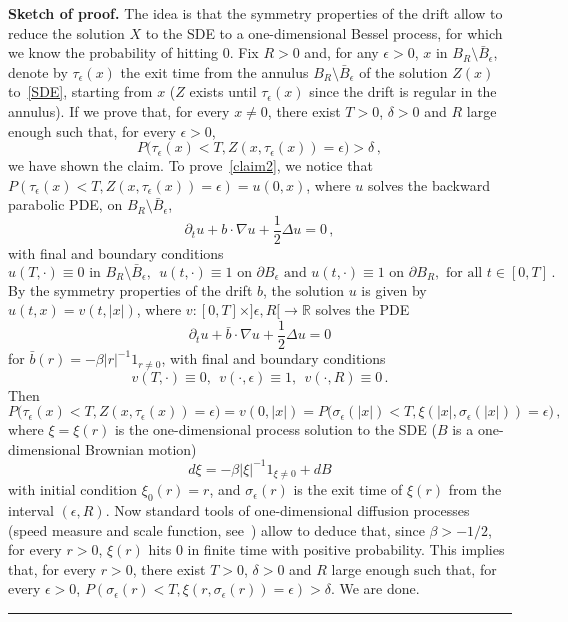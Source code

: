 \documentclass[a4paper,10pt]{article}
\newenvironment{proof}[1][Proof]{\noindent\textbf{#1.} }{\ \rule{0.5em}{0.5em}}
\newcommand{\mr}{\mathbb{R}}
\newcommand{\eps}{\epsilon}
\begin{document}
\begin{proof}[Sketch of proof]
The idea is that the symmetry properties of the drift allow to reduce the solution $X$ to the SDE to a one-dimensional Bessel process, for which we know the probability of hitting $0$. Fix $R>0$ and, for any $\eps>0$, $x$ in $B_R\setminus\bar{B}_\eps$, denote by $\tau_\eps(x)$ the exit time from the annulus $B_R\setminus\bar{B}_\eps$ of the solution $Z(x)$ to~\eqref{SDE}, starting from $x$ ($Z$ exists until $\tau_\eps(x)$ since the drift is regular in the annulus). If we prove that, for every $x\neq0$, there exist $T>0$, $\delta>0$ and $R$ large enough such that, for every $\eps>0$,
\begin{equation}
P\big( \tau_\eps(x)<T,Z(x,\tau_\eps(x))=\eps\big)>\delta \, ,\label{claim2}
\end{equation}
we have shown the claim. To prove~\eqref{claim2}, we notice that $P(\tau_\eps(x)<T,Z(x,\tau_\eps(x))=\eps)=u(0,x)$, where $u$ solves the backward parabolic PDE, on $B_R\setminus\bar{B}_\eps$,
\begin{equation*}
\partial_tu+b\cdot\nabla u+\frac12\Delta u=0 \, ,
\end{equation*}
with final and boundary conditions
\begin{equation*}
u(T,\cdot)\equiv0 \text{ in } B_R\setminus\bar{B}_\eps,\ \ u(t,\cdot) \equiv 1 \text{ on } \partial B_\eps \text{ and } 
u(t,\cdot)\equiv 1 \text{ on } \partial B_R, \text{ for all } t \in [0,T]\,.
\end{equation*}
By the symmetry properties of the drift $b$, the solution $u$ is given by $u(t,x)=v(t,|x|)$, where $v \colon [0,T]\times]\eps,R[\rightarrow\mr$ solves the PDE
\begin{equation*}
\partial_tu+\bar{b}\cdot\nabla u+\frac12\Delta u=0
\end{equation*}
for $\bar{b}(r)=-\beta|r|^{-1}1_{r\neq0}$, with final and boundary conditions
\begin{equation*}
v(T,\cdot)\equiv0,\ \ v(\cdot,\eps)\equiv1,\ \ v(\cdot,R)\equiv0 \, .
\end{equation*}
Then 
\begin{equation*}
P\big(\tau_\eps(x)<T,Z(x,\tau_\eps(x))=\eps\big)=v(0,|x|)=P\big(\sigma_\eps(|x|)<T,\xi(|x|,\sigma_\eps(|x|))=\eps\big)\,, 
\end{equation*}
where $\xi=\xi(r)$ is the one-dimensional process solution to the SDE ($B$ is a one-dimensional Brownian motion)
\begin{equation*}
d\xi=-\beta|\xi|^{-1}1_{\xi\neq0}+dB
\end{equation*}
with initial condition $\xi_0(r)=r$, and $\sigma_\eps(r)$ is the exit time of $\xi(r)$ from the interval $(\eps,R)$. Now standard tools of one-dimensional diffusion processes (speed measure and scale function, see~\cite[Chapter~16]{BREIMAN}) allow to deduce that, since $\beta>-1/2$, for every $r>0$, $\xi(r)$ hits $0$ in finite time with positive probability. This implies that, for every $r>0$, there exist $T>0$, $\delta>0$ and $R$ large enough such that, for every $\eps>0$, $P(\sigma_\eps(r)<T,\xi(r,\sigma_\eps(r))=\eps)>\delta$. We are done.
\end{proof}
\end{document}
